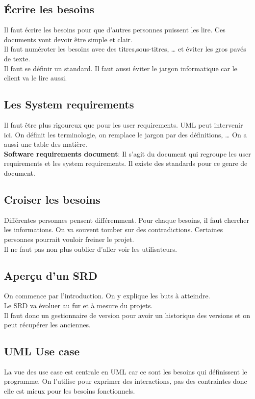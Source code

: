 \subsection{Écrire les besoins}
Il faut écrire les besoins pour que d’autres personnes puissent les lire. Ces documents vont devoir être simple et clair.
\\Il faut numéroter les besoins avec des titres,sous-titres, … et éviter les gros pavés de texte.
\\Il faut se définir un standard. Il faut aussi éviter le jargon informatique car le client va le lire aussi.



\subsection{Les System requirements}
Il faut être plus rigoureux que pour les user requirements. UML peut intervenir ici.
On définit les terminologie, on remplace le jargon par des définitions, … On a aussi une table des matière.
\\\textbf{Software requirements document}: Il s’agit du document qui regroupe les user requirements et les system requirements. Il existe des standards pour ce genre de document.



\subsection{Croiser les besoins}
Différentes personnes pensent différemment. Pour chaque besoins, il faut chercher les informations. On va souvent tomber sur des contradictions.
Certaines personnes pourrait vouloir freiner le projet.
\\Il ne faut pas non plus oublier d’aller voir les utilisateurs.



\subsection{Aperçu d’un SRD}
On commence par l’introduction. On y explique les buts à atteindre.
\\Le SRD va évoluer au fur et à mesure du projets.
\\Il faut donc un gestionnaire de version pour avoir un historique des versions et on peut récupérer les anciennes.



\subsection{UML Use case}
La vue des use case est centrale en UML car ce sont les besoins qui définissent le programme.
On l’utilise pour exprimer des interactions, pas des contraintes donc elle est mieux pour les besoins fonctionnels.



